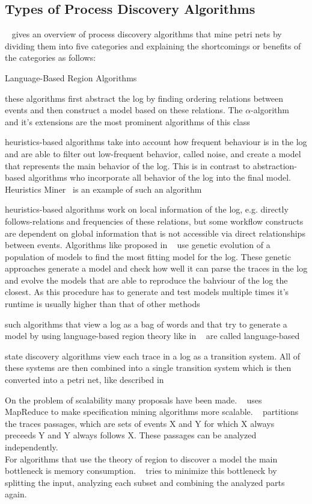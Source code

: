 \documentclass[
	a4paper,
	pagesize,
	pdftex,
	12pt,
	twoside, %
	BCOR=5mm, %
	ngerman,
	fleqn,
	final,
	]{scrartcl}
\begin{document}
\subsection{Types of Process Discovery Algorithms}
~\cite{miningalgorithms} gives an overview of process discovery algorithms that mine petri nets by dividing them into five categories and explaining the shortcomings or benefits of the categories as follows:
\begin{labeling}{Language-Based Region Algorithms}
\item [Abstraction-Based]these algorithms first abstract the log by finding ordering relations between events and then construct a model based on these relations. The $\alpha$-algorithm~\cite{Relations} and it's extensions are the most prominent algorithms of this class
\item[Heuristic-Based]heuristics-based algorithms take into account how frequent behaviour is in the log and are able to filter out low-frequent behavior, called noise, and create a model that represents the main behavior of the log. This is in contrast to abstraction-based algorithms who incorporate all behavior of the log into the final model. Heuristics Miner~\cite{HeuristicsMiner} is an example of such an algorithm
\item[Search-Based]heuristics-based algorithms work on local information of the log, e.g. directly follows-relations and frequencies of these relations, but some workflow constructs are dependent on global information that is not accessible via direct relationships between events. Algorithms like proposed in ~\cite{GeneticMiner} use genetic evolution of a population of models to find the most fitting model for the log. These genetic approaches generate a model and check how well it can parse the traces in the log and evolve the models that are able to reproduce the bahviour of the log the closest. As this procedure has to generate and test models multiple times it's runtime is usually higher than that of other methods
\item[Language-Based Region Algorithms]such algorithms that view a log as a bag of words and that try to generate a model by using language-based region theory like in  ~\cite{LanguageMiner} are called language-based
\item[State Discovery Algorithms]state discovery algorithms view each trace in a log as a transition system. All of these systems are then combined into a single transition system which is then converted into a petri net, like described in ~\cite{StateMiner}
\end{labeling}
On the problem of scalability many proposals have been made. ~\cite{MapReduce} uses MapReduce to make specification mining algorithms more scalable. ~\cite{Passages} partitions the traces passages, which are sets of events X and Y for which X always preceeds Y and Y always follows X. These passages can be analyzed independently.\\
For algorithms that use the theory of region to discover a model the main bottleneck is memory consumption. ~\cite{Regions} tries to minimize this bottleneck by splitting the input, analyzing each subset and combining the analyzed parts again.
\end{document}
